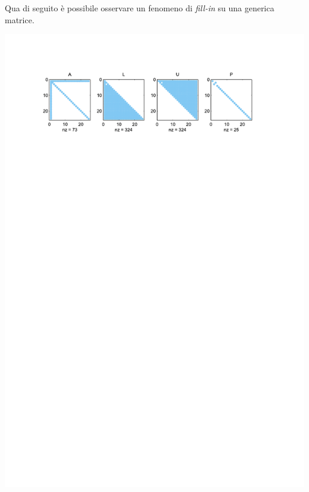 \begin{examplebox}
    Qua di seguito è possibile osservare un fenomeno di \emph{fill-in} su una generica matrice.

    \highspace
    \centering
    \includegraphics[width=\textwidth]{img/fill_in_1.pdf}
\end{examplebox}

